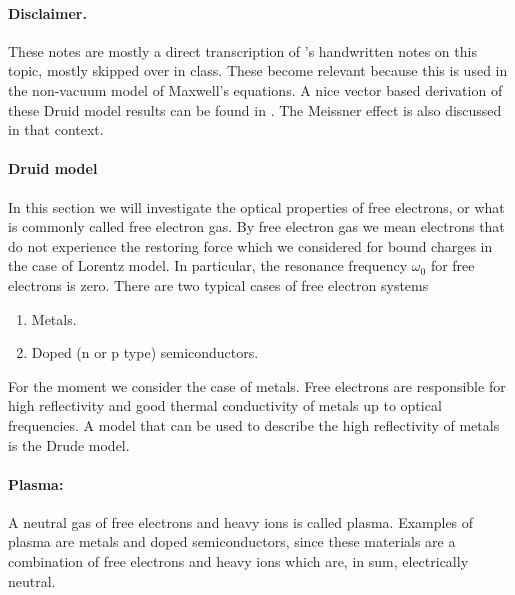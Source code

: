 \paragraph{Disclaimer.}
%
These notes are mostly a direct transcription of \mo's handwritten notes on this topic, mostly skipped over in class.  These become relevant because this is used in the non-vacuum model of Maxwell's equations.
%
A nice vector based derivation of these Druid model results can be found in \citep{ashcroft1976solid}.  The Meissner effect is also discussed in that context.
%
\paragraph{Druid model}
%
In this section we will investigate the optical properties of free electrons, or what is commonly called free electron gas.
%
By free electron gas we mean electrons that do not experience the restoring force which we considered for bound charges in the case of Lorentz model.  In particular, the resonance frequency \( \omega_0 \) for free electrons is zero.
%
There are two typical cases of free electron systems
%
\begin{enumerate}[a]
\item Metals.
\item Doped (n or p type) semiconductors.
\end{enumerate}
%
For the moment we consider the case of metals.
%
Free electrons are responsible for high reflectivity and good thermal conductivity of metals up to optical frequencies.  A model that can be used to describe the high reflectivity of metals is the Drude model.
%
\paragraph{Plasma:} A neutral gas of free electrons and heavy ions is called plasma.  Examples of plasma are metals and doped semiconductors, since these materials are a combination of free electrons and heavy ions which are, in sum, electrically neutral.
%
